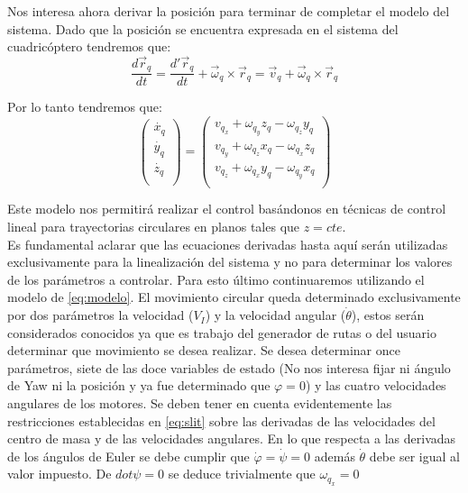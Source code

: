 \documentclass[main]{subfiles}
\begin{document}
Nos interesa ahora derivar la posici\'on para terminar de completar el modelo del sistema. Dado que la posici\'on se encuentra expresada en el sistema del cuadric\'optero tendremos que:
\begin{equation}
\frac{d\vec{r}_q}{dt}=\frac{d\prime\vec{r}_q}{dt}+\vec{\omega}_q \times \vec{r}_q=\vec{v}_q+\vec{\omega}_q \times \vec{r}_q
\end{equation}

Por lo tanto tendremos que:
\begin{equation}
\label{eq:MVEcirc}
\left(\begin{array}{c}
\dot{x_q}\\
\dot{y_q}\\
\dot{z_q}\\
\end{array}\right)=\left(\begin{array}{c}
v_{q_x}+\omega_{q_y}z_q-\omega_{q_z}y_q\\
v_{q_y}+\omega_{q_z}x_q-\omega_{q_x}z_q\\
v_{q_z}+\omega_{q_x}y_q-\omega_{q_y}x_q\\
\end{array}\right)
\end{equation}

Este modelo nos permitir\'a realizar el control bas\'andonos en t\'ecnicas de control lineal para trayectorias circulares en planos tales que $z=cte$.\\

Es fundamental aclarar que las ecuaciones derivadas hasta aqu\'i ser\'an utilizadas exclusivamente para la linealizaci\'on del sistema y no para determinar los valores de los par\'ametros a controlar. Para esto \'ultimo continuaremos utilizando el modelo de \ref{eq:modelo}. El movimiento circular queda determinado exclusivamente por dos par\'ametros la velocidad ($V_I$) y la velocidad angular ($\dot{\theta}$), estos ser\'an considerados conocidos ya que es trabajo del generador de rutas o del usuario determinar que movimiento se desea realizar. Se desea determinar once par\'ametros, siete de las doce variables de estado (No nos interesa fijar ni \'angulo de Yaw ni la posici\'on y ya fue determinado que $\varphi = 0$) y las cuatro velocidades angulares de los motores.  Se deben tener en cuenta evidentemente las restricciones establecidas en \ref{eq:slit} sobre las derivadas de las velocidades del centro de masa y de las velocidades angulares. En lo que respecta a las derivadas de los \'angulos de Euler se debe cumplir que $\dot{\varphi}=\dot{\psi}=0$ adem\'as $\dot{\theta}$ debe ser igual al valor impuesto. De $dot{\psi} = 0$ se deduce trivialmente que $\omega_{q_x} = 0$ 
\end{document}
